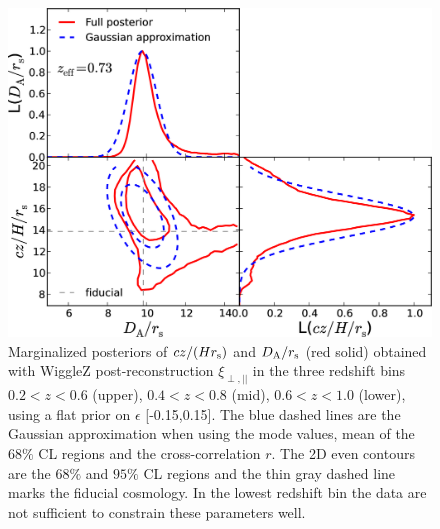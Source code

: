 \documentclass[iop,twocolappendix]{emulateapj}
\begin{document}
\begin{figure}
\begin{center}
\includegraphics[width=0.9\columnwidth]{figures/z60_Model/stacked_L2D_rpt_wedges_postRec_T015_WiggleZ_z0pt6_1pt0.png}
\caption{\label{fig:HDA_z26_epsilon0.15} Marginalized posteriors of $cz/(Hr_{\rm s})$ and $D_{\rm A}/r_{\rm s}$ (red solid) obtained with WiggleZ post-reconstruction $\xi_{\perp, ||}$ in the three redshift bins $0.2<z<0.6$ (upper), $0.4<z<0.8$ (mid), $0.6<z<1.0$ (lower), using a flat prior on $\epsilon$ [-0.15,0.15].  The blue dashed lines are the Gaussian approximation when using the mode values, mean of the 68$\%$ CL regions and the cross-correlation $r$. The 2D even contours are the $68\%$ and $95\%$ CL regions and the thin gray dashed line marks the fiducial cosmology.  In the lowest redshift bin the data are not sufficient to constrain these parameters well.}
\end{center}
\end{figure}
\end{document}
